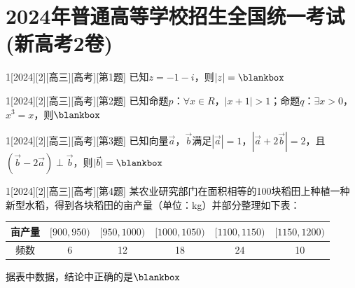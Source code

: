\section{2024年普通高等学校招生全国统一考试(新高考2卷)}
\begin{example}{1}[2024][2][高三][高考][第1题]
已知$z=-1-i$，则$|z|=\blankbox$
\begin{choices}
\end{choices}
\end{example}

\begin{example}{1}[2024][2][高三][高考][第2题]
已知命题$p$：$\forall x\in R$，$|x+1|>1$；命题$q$：$\exists x>0$，$x^3=x$，则$\blankbox$
\begin{choices}
\end{choices}
\end{example}

\begin{example}{1}[2024][2][高三][高考][第3题]
已知向量$\vec{a}$，$\vec{b}$满足$|\vec{a}|=1$，$|\vec{a}+2\vec{b}|=2$，且$(\vec{b}-2\vec{a})\perp\vec{b}$，则$|\vec{b}|=\blankbox$
\begin{choices}
\end{choices}
\end{example}

\begin{example}{1}[2024][2][高三][高考][第4题]
某农业研究部门在面积相等的100块稻田上种植一种新型水稻，得到各块稻田的亩产量（单位：kg）并部分整理如下表：
\begin{center}
\begin{tabular}{|c|c|c|c|c|c|}
\hline
亩产量 & $[900,950)$ & $[950,1000)$ & $[1000,1050)$ & $[1100,1150)$ & $[1150,1200)$ \\
\hline
频数 & 6 & 12 & 18 & 24 & 10 \\
\hline
\end{tabular}
\end{center}
据表中数据，结论中正确的是$\blankbox$
\begin{choices}
\end{choices}
\end{example}

